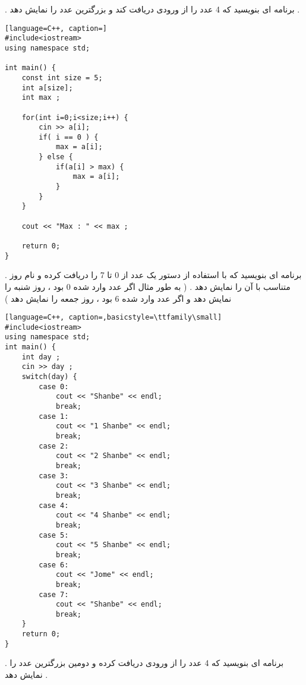 \documentclass[12pt]{article}
\begin{document}
\newpage

 . برنامه ای بنویسید که 4 عدد را از ورودی دریافت کند و بزرگترین عدد را نمایش دهد .





\begin{latin}
\begin{lstlisting}[language=C++, caption=]
#include<iostream>
using namespace std;

int main() {
	const int size = 5;
	int a[size];
	int max ;
	
	for(int i=0;i<size;i++) {
		cin >> a[i];
		if( i == 0 ) {
			max = a[i];
		} else {
			if(a[i] > max) {
				max = a[i];
			}
		}
	}
	
	cout << "Max : " << max ;
	
	return 0;
}
\end{lstlisting}
\end{latin}






\newpage

 . برنامه ای بنویسید که با استفاده از دستور 
یک عدد از 0 تا 7 را دریافت کرده و نام روز متناسب با آن را نمایش دهد . ( به طور مثال اگر عدد وارد شده 0 بود ، روز شنبه را نمایش دهد و اگر عدد وارد شده 6 بود ، روز جمعه را نمایش دهد  )




\begin{latin}
\begin{lstlisting}[language=C++, caption=,basicstyle=\ttfamily\small]
#include<iostream>
using namespace std;
int main() {
	int day ;
	cin >> day ;
	switch(day) {
		case 0:
			cout << "Shanbe" << endl;
			break;
		case 1: 
			cout << "1 Shanbe" << endl;
			break;
		case 2:
			cout << "2 Shanbe" << endl;
			break;
		case 3:
			cout << "3 Shanbe" << endl;
			break;
		case 4:
			cout << "4 Shanbe" << endl;
			break;
		case 5:
			cout << "5 Shanbe" << endl;
			break;
		case 6:
			cout << "Jome" << endl;
			break;
		case 7:
			cout << "Shanbe" << endl;
			break;
	}
	return 0;
}
\end{lstlisting}
\end{latin}








 . برنامه ای بنویسید که 4 عدد را از ورودی دریافت کرده و دومین بزرگترین عدد را نمایش دهد .
\end{document}
